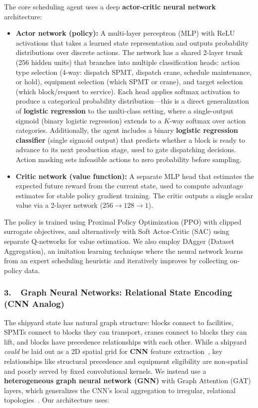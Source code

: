 \documentclass[12pt,letterpaper]{article}
\begin{document}
The core scheduling agent uses a deep \textbf{actor-critic neural network} architecture:

\begin{itemize}[leftmargin=1.5em]
  \item \textbf{Actor network (policy):} A multi-layer perceptron (MLP) with ReLU activations that takes a learned state representation and outputs probability distributions over discrete actions. The network has a shared 2-layer trunk (256 hidden units) that branches into multiple classification heads: action type selection (4-way: dispatch SPMT, dispatch crane, schedule maintenance, or hold), equipment selection (which SPMT or crane), and target selection (which block/request to service). Each head applies softmax activation to produce a categorical probability distribution---this is a direct generalization of \textbf{logistic regression} to the multi-class setting, where a single-output sigmoid (binary logistic regression) extends to a $K$-way softmax over action categories. Additionally, the agent includes a binary \textbf{logistic regression classifier} (single sigmoid output) that predicts whether a block is ready to advance to its next production stage, used to gate dispatching decisions. Action masking sets infeasible actions to zero probability before sampling.

  \item \textbf{Critic network (value function):} A separate MLP head that estimates the expected future reward from the current state, used to compute advantage estimates for stable policy gradient training. The critic outputs a single scalar value via a 2-layer network ($256 \to 128 \to 1$).
\end{itemize}

The policy is trained using Proximal Policy Optimization (PPO) with clipped surrogate objectives, and alternatively with Soft Actor-Critic (SAC) using separate Q-networks for value estimation. We also employ DAgger (Dataset Aggregation), an imitation learning technique where the neural network learns from an expert scheduling heuristic and iteratively improves by collecting on-policy data.

\subsubsection*{3.\ \ Graph Neural Networks: Relational State Encoding (CNN Analog)}

The shipyard state has natural graph structure: blocks connect to facilities, SPMTs connect to blocks they can transport, cranes connect to blocks they can lift, and blocks have precedence relationships with each other. While a shipyard \emph{could} be laid out as a 2D spatial grid for \textbf{CNN} feature extraction~\cite{wang2021cnn}, key relationships like structural precedence and equipment eligibility are non-spatial and poorly served by fixed convolutional kernels. We instead use a \textbf{heterogeneous graph neural network (GNN)} with Graph Attention (GAT) layers, which generalizes the CNN's local aggregation to irregular, relational topologies~\cite{bronstein2021geometric}. Our architecture uses:
\end{document}

